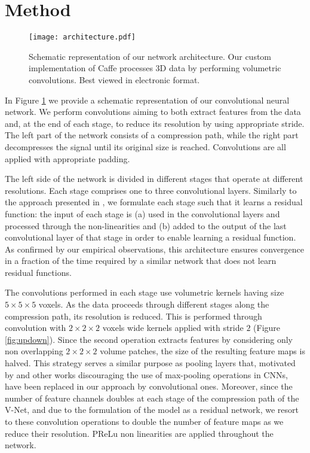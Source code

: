 \documentclass{llncs}
\begin{document}
\section{Method}
\label{sec:method}

\begin{figure} 	
\centering 	
\texttt{[image: architecture.pdf]} 	
\caption{Schematic representation of our network architecture. Our custom implementation of Caffe \cite{jia2014caffe} processes 3D data by performing volumetric convolutions. Best viewed in electronic format.} \label{fig:VnetImage} 
\end{figure}

In Figure \ref{fig:VnetImage} we provide a schematic representation of our convolutional neural network. 
We perform convolutions aiming to both extract features from the data and, at the end of each stage, to reduce its resolution by using appropriate stride. The left part of the network consists of a compression path, while the right part decompresses the signal until its original size is reached. Convolutions are all applied with appropriate padding.

The left side of the network is divided in different stages that operate at different resolutions. Each stage comprises one to three convolutional layers. Similarly to the approach presented in \cite{he2015deep}, we formulate each stage such that it learns a residual function: the input of each stage is (a) used in the convolutional layers and processed through the non-linearities and (b) added to the output of the last convolutional layer of that stage in order to enable learning a residual function. As confirmed by our empirical observations, this architecture ensures convergence in a fraction of the time required by a similar network that does not learn residual functions. 

The convolutions performed in each stage use volumetric kernels having size $5\times5\times5$ voxels.
As the data proceeds through different stages along the compression path, its resolution is reduced. This is performed through convolution with $2\times2\times2$ voxels wide kernels applied with stride $2$ (Figure \ref{fig:updown}). Since the second operation extracts features by considering only non overlapping $2\times2\times2$ volume patches, the size of the resulting feature maps is halved. 
This strategy serves a similar purpose as pooling layers that, motivated by \cite{springenberg2014striving} and other works discouraging the use of max-pooling operations in CNNs, have been replaced in our approach by convolutional ones. Moreover, since the number of feature channels doubles at each stage of the compression path of the V-Net, and due to the formulation of the model as a residual network, we resort to these convolution operations to double the number of feature maps as we reduce their resolution. PReLu non linearities are applied throughout the network.
\end{document}
